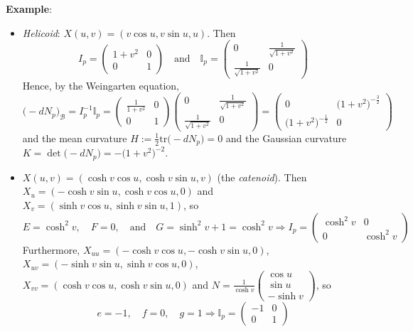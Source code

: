 \noindent\textbf{Example}:
\begin{itemize}
\item \textit{Helicoid}: $X(u, v) = (v\cos u, v\sin u, u)$. Then
\[
I_p = \begin{pmatrix}1 + v^2 & 0\\ 0 & 1\end{pmatrix} \quad\text{and}\quad \mathbb{I}_p = \begin{pmatrix}0 & \frac{1}{\sqrt{1 + v^2}}\\[2mm] \frac{1}{\sqrt{1 + v^2}} & 0\end{pmatrix}
\]
Hence, by the Weingarten equation,
\[
\big(-dN_p\big)_\mathcal{B} = I_p^{-1}\mathbb{I}_p = \begin{pmatrix}\frac{1}{1 + v^2} & 0\\[2mm] 0 & 1\end{pmatrix}\begin{pmatrix}0 & \frac{1}{\sqrt{1 + v^2}}\\[2mm] \frac{1}{\sqrt{1 + v^2}} & 0\end{pmatrix} = \begin{pmatrix}0 & \big(1 + v^2\big)^{-\frac{3}{2}}\\[2mm] \big(1 + v^2\big)^{-\frac{1}{2}} & 0\end{pmatrix}
\]
and the mean curvature $H := \frac{1}{2}\mathrm{tr}\big(-dN_p\big) = 0$ and the Gaussian curvature $K = \det\big(-dN_p\big) = -\big(1 + v^2\big)^{-2}$.
\item $X(u, v) = (\cosh v\cos u, \cosh v\sin u, v)$ (the \textit{catenoid}). Then $X_u = (-\cosh v\sin u, \cosh v\cos u, 0)$ and $X_v = (\sinh v\cos u, \sinh v\sin u, 1)$, so
\[
E = \cosh^2 v, \quad F = 0, \quad\text{and}\quad G = \sinh^2 v + 1 = \cosh^2 v \Rightarrow I_p = \begin{pmatrix}\cosh^2 v & 0\\ 0 & \cosh^2 v\end{pmatrix}
\]
Furthermore, $X_{uu} = (-\cosh v\cos u, -\cosh v\sin u, 0)$, $X_{uv} = (-\sinh v\sin u, \sinh v\cos u, 0)$, $X_{vv} = (\cosh v\cos u, \cosh v\sin u, 0)$ and $N = \frac{1}{\cosh v}\begin{pmatrix}\cos u\\ \sin u\\ -\sinh v\end{pmatrix}$, so
\[
e = -1, \quad f = 0, \quad g = 1 \Rightarrow \mathbb{I}_p = \begin{pmatrix}-1 & 0\\ 0 & 1\end{pmatrix}
\]
\end{itemize}
